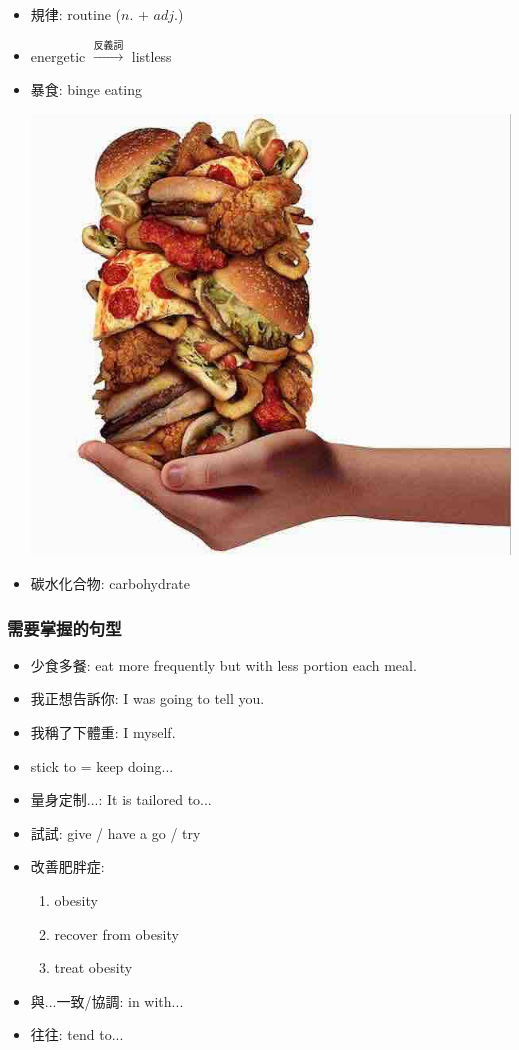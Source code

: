 \begin{multicols}{2}
\begin{itemize}
  \item 規律: routine ($n.$ + $adj.$)
  \item energetic $\xrightarrow{\text{反義詞}}$ listless
  \item 暴食: binge eating
  \begin{center}
    \includegraphics[scale=.3]{pics/binge-eating}
  \end{center}
  \item 碳水化合物: carbohydrate
\end{itemize}
\end{multicols}

\subsubsection*{需要掌握的句型}

\begin{itemize}
  \itemsep0em
  \item 少食多餐: eat more frequently but with less portion each meal.
  \item 我正想告訴你: I was going to tell you.
  \item 我稱了下體重: I  myself.
  \item stick to = keep doing...
  \item 量身定制...: It is tailored to...
  \item 試試: give / have a go / try
  \item 改善肥胖症:
  \begin{enumerate}
    \itemsep0em
    \item {} obesity
    \item recover from obesity
    \item treat obesity
  \end{enumerate}
  \item 與...一致/協調: in  with...
  \item 往往: tend to...
\end{itemize}

